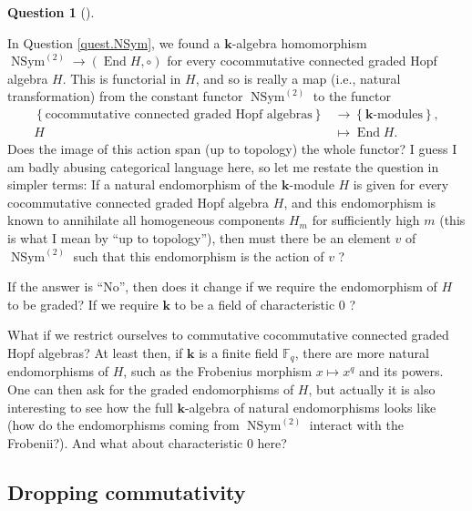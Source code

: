 \documentclass[numbers=enddot,12pt,final,onecolumn,notitlepage,abstracton]{scrartcl}%
\theoremstyle{definition}
\newtheorem{quest}[theo]{Question}
\newenvironment{question}[1][]
{\begin{quest}[#1]\begin{leftbar}}
{\end{leftbar}\end{quest}}
\newenvironment{question}[1][Question]{\noindent\textbf{#1.} }{\ \rule{0.5em}{0.5em}}
\begin{document}
\begin{question}
\label{quest.allfunctorial}In Question \ref{quest.NSym}, we found a
$\mathbf{k}$-algebra homomorphism $\operatorname*{NSym}\nolimits^{\left(
2\right)  }\rightarrow\left(  \operatorname*{End}H,\circ\right)  $ for every
cocommutative connected graded Hopf algebra $H$. This is functorial in $H$,
and so is really a map (i.e., natural transformation) from the constant
functor $\operatorname*{NSym}\nolimits^{\left(  2\right)  }$ to the functor%
\begin{align*}
\left\{  \text{cocommutative connected graded Hopf algebras}\right\}   &
\rightarrow\left\{  \mathbf{k}\text{-modules}\right\}  ,\\
H  &  \mapsto\operatorname*{End}H.
\end{align*}
Does the image of this action span (up to topology) the whole functor? I guess
I am badly abusing categorical language here, so let me restate the question
in simpler terms: If a natural endomorphism of the $\mathbf{k}$-module $H$ is
given for every cocommutative connected graded Hopf algebra $H$, and this
endomorphism is known to annihilate all homogeneous components $H_{m}$ for
sufficiently high $m$ (this is what I mean by \textquotedblleft up to
topology\textquotedblright), then must there be an element $v$ of
$\operatorname*{NSym}\nolimits^{\left(  2\right)  }$ such that this
endomorphism is the action of $v$ ?

If the answer is \textquotedblleft No\textquotedblright, then does it change
if we require the endomorphism of $H$ to be graded? If we require $\mathbf{k}$
to be a field of characteristic $0$ ?

What if we restrict ourselves to commutative cocommutative connected graded
Hopf algebras? At least then, if $\mathbf{k}$ is a finite field $\mathbb{F}%
_{q}$, there are more natural endomorphisms of $H$, such as the Frobenius
morphism $x\mapsto x^{q}$ and its powers. One can then ask for the graded
endomorphisms of $H$, but actually it is also interesting to see how the full
$\mathbf{k}$-algebra of natural endomorphisms looks like (how do the
endomorphisms coming from $\operatorname*{NSym}\nolimits^{\left(  2\right)  }$
interact with the Frobenii?). And what about characteristic $0$ here?
\end{question}

\subsection{Dropping commutativity}
\end{document}
